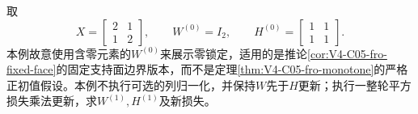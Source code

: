 \label{struct:V4-C05-CH32}
\begin{example}[一次平方NMF顺序更新]\label{exm:V4-C05-one-nmf-step}
取
\[
X=\begin{bmatrix}2&1\\1&2\end{bmatrix},\qquad
W^{(0)}=I_2,\qquad
H^{(0)}=\begin{bmatrix}1&1\\1&1\end{bmatrix}.
\]
本例故意使用含零元素的$W^{(0)}$来展示零锁定，适用的是推论\ref{cor:V4-C05-fro-fixed-face}的固定支持面边界版本，而不是定理\ref{thm:V4-C05-fro-monotone}的严格正初值假设。本例不执行可选的列归一化，并保持$W$先于$H$更新；执行一整轮平方损失乘法更新，求$W^{(1)},H^{(1)}$及新损失。

\label{struct:V4-C05-CH33}
\end{example}
